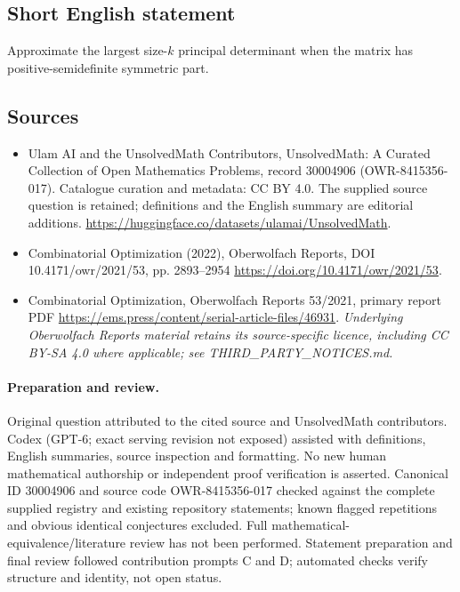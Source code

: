 \documentclass[11pt]{article}
\begin{document}
\subsection{Short English statement}
Approximate the largest size-$k$ principal determinant when the matrix has positive-semidefinite symmetric part.
\subsection{Sources}
\begin{itemize}
\item[\hypertarget{source:30004906:1}{S1}] Ulam AI and the UnsolvedMath Contributors, UnsolvedMath: A Curated Collection of Open Mathematics Problems, record 30004906 (OWR-8415356-017). Catalogue curation and metadata: CC BY 4.0. The supplied source question is retained; definitions and the English summary are editorial additions.
\url{https://huggingface.co/datasets/ulamai/UnsolvedMath}.
\item[\hypertarget{source:30004906:2}{S2}] Combinatorial Optimization (2022), Oberwolfach Reports, DOI 10.4171/owr/2021/53, pp. 2893--2954
\url{https://doi.org/10.4171/owr/2021/53}.
\item[\hypertarget{source:30004906:3}{S3}] Combinatorial Optimization, Oberwolfach Reports 53/2021, primary report PDF
\url{https://ems.press/content/serial-article-files/46931}.
\textit{Underlying Oberwolfach Reports material retains its source-specific licence, including CC BY-SA 4.0 where applicable; see THIRD\_PARTY\_NOTICES.md.}
\end{itemize}
\paragraph{Preparation and review.}
Original question attributed to the cited source and UnsolvedMath contributors. Codex (GPT-6; exact serving revision not exposed) assisted with definitions, English summaries, source inspection and formatting. No new human mathematical authorship or independent proof verification is asserted. Canonical ID 30004906 and source code OWR-8415356-017 checked against the complete supplied registry and existing repository statements; known flagged repetitions and obvious identical conjectures excluded. Full mathematical-equivalence/literature review has not been performed. Statement preparation and final review followed contribution prompts C and D; automated checks verify structure and identity, not open status.
\label{end:30004906}
\end{document}
